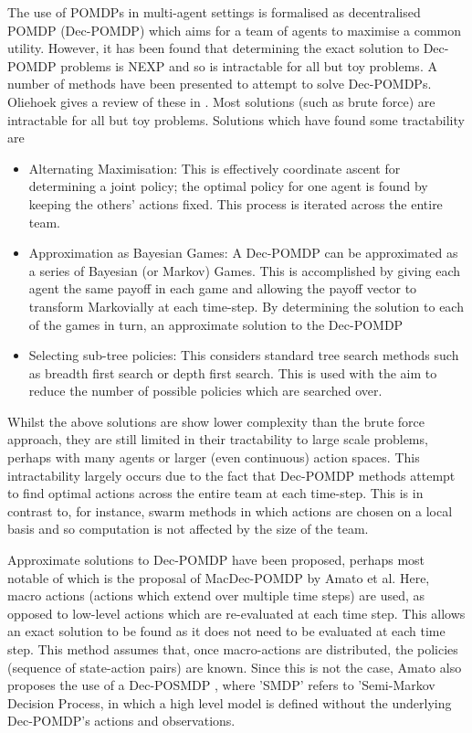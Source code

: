 \documentclass[../sample.tex]{subfiles}
\begin{document}
The use of POMDPs in multi-agent settings is formalised as decentralised POMDP (Dec-POMDP) which
aims for a team of agents to maximise a common utility. However, it has been found that determining
the exact solution to Dec-POMDP problems is NEXP \cite{Eker2011} and so is intractable for all but
toy problems. A number of methods have been presented to attempt to solve Dec-POMDPs. Oliehoek gives
a review of these in \cite{OliehoekDecentralizedPOMDPs}. Most solutions (such as brute force) are
intractable for all but toy problems. Solutions which have found some tractability are

\begin{itemize} 
\item Alternating Maximisation: This is effectively coordinate ascent for determining a joint
policy; the optimal policy for one agent is found by keeping the others' actions fixed. This process
is iterated across the entire team.
\item Approximation as Bayesian Games: A Dec-POMDP can be approximated as a series of Bayesian (or
Markov) Games. This is accomplished by giving each agent the same payoff in each game and allowing
the payoff vector to transform Markovially at each time-step. By determining the solution to each of
the games in turn, an approximate solution to the Dec-POMDP
\item Selecting sub-tree policies: This considers standard tree search methods such as breadth
first search or depth first search. This is used with the aim to reduce the number of possible
policies which are searched over. 
\end{itemize}

Whilst the above solutions are show lower complexity than the brute force approach, they
are still limited in their tractability to large scale problems, perhaps with many agents
or larger (even continuous) action spaces. This intractability largely occurs due to the
fact that Dec-POMDP methods attempt to find optimal actions across the entire team at
each time-step. This is in contrast to, for instance, swarm methods in which actions are chosen on a
local basis and so computation is not affected by the size of the team. 

Approximate solutions to Dec-POMDP have been proposed, perhaps most notable of which is the proposal
of MacDec-POMDP \cite{Amato2015} by Amato et al. Here, macro actions (actions which extend over
multiple time steps) are used, as opposed to low-level actions which are re-evaluated at each time
step. This allows an exact solution to be found as it does not need to be evaluated at each time
step. This method assumes that, once macro-actions are distributed, the policies (sequence of
state-action pairs) are known. Since this is not the case, Amato also proposes the use of a
Dec-POSMDP \cite{Amato2017Decision-MakingLearning}, where 'SMDP' refers to 'Semi-Markov Decision
Process, in which a high level model is defined without the underlying Dec-POMDP's actions and
observations.
\end{document}
